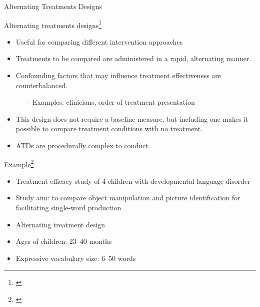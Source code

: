 \documentclass{beamer}
\begin{document}
\begin{frame}
\begin{center}
\Huge{Alternating Treatments Designs}
\end{center}
\end{frame}

% 
\begin{frame}{Alternating treatments designs\footnote{\tiny{\citet[p. 211]{Kearns1986}}}}
	\begin{itemize}
	\item Useful for comparing different intervention approaches
	\item Treatments to be compared are administered in a rapid, alternating manner.
	\item Confounding factors that may influence treatment effectiveness are counterbalanced.
		\begin{itemize}
		\item[-] Examples: clinicians, order of treatment presentation
		\end{itemize}
	\item This design does not require a baseline measure, but including one makes it possible to compare treatment conditions with no treatment.
	\item ATDs are procedurally complex to conduct.
	\end{itemize}
\end{frame}

% 
\begin{frame}{Example\footnote{\tiny{\citet{Olswang1983}}}}
	\begin{itemize}
	\item Treatment efficacy study of 4 children with developmental language disorder
	\item Study aim: to compare \alert{object manipulation} and \alert{picture identification} for facilitating single-word production 
	\item Alternating treatment design 
	\item Ages of children: 23--40 months
	\item Expressive vocabulary size: 6--50 words
	\end{itemize}
\end{frame}
\end{document}
